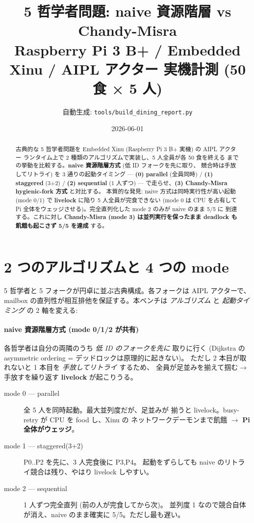\documentclass[a4paper,11pt]{ltjsarticle}
\title{5 哲学者問題: naive 資源階層 vs Chandy-Misra \\
  \large Raspberry Pi 3 B+ / Embedded Xinu / AIPL アクター 実機計測 (50 食 × 5 人)}
\author{自動生成: \texttt{tools/build\_dining\_report.py}}
\date{2026-06-01}
\begin{document}
\maketitle

\begin{abstract}
古典的な 5 哲学者問題を Embedded Xinu (Raspberry Pi 3 B+ 実機) の AIPL アクター
ランタイム上で 2 種類のアルゴリズムで実装し、5 人全員が各 50 食を終える
までの挙動を比較する。\textbf{naive 資源階層方式} (低 ID フォークを先に取り、
競合時は手放してリトライ) を 3 通りの起動タイミング — \textbf{(0) parallel}
(全員同時) / \textbf{(1) staggered} (3+2) / \textbf{(2) sequential} (1 人ずつ) —
で走らせ、\textbf{(3) Chandy-Misra hygienic-fork 方式} と対比する。
本質的な発見: naive 方式は同時実行性が高い起動 (mode 0/1) で
\textbf{livelock} に陥り 5 人全員が完食できない (mode 0 は CPU を占有して
Pi 全体をウェッジさせる)。完全直列化した mode 2 のみが naive のまま 5/5 に
到達する。これに対し \textbf{Chandy-Misra (mode 3) は並列実行を保ったまま
deadlock も飢餓も起こさず 5/5 を達成} する。
\end{abstract}

\section{2 つのアルゴリズムと 4 つの mode}

5 哲学者と 5 フォークが円卓に並ぶ古典構成。各フォークは AIPL アクターで、
mailbox の直列性が相互排他を保証する。本ベンチは \emph{アルゴリズム} と
\emph{起動タイミング} の 2 軸を変える:

\paragraph{naive 資源階層方式 (mode 0/1/2 が共有)}
各哲学者は自分の両隣のうち \emph{低 ID のフォークを先に} 取りに行く
(Dijkstra の asymmetric ordering = デッドロックは原理的に起きない)。
ただし 2 本目が取れないと 1 本目を \emph{手放してリトライ} するため、
全員が足並みを揃えて掴む$\to$手放すを繰り返す \textbf{livelock} が起こりうる。

\begin{description}
  \item[mode 0 — parallel] 全 5 人を同時起動。最大並列度だが、足並みが
        揃うと livelock。busy-retry が CPU を food し、Xinu の
        ネットワークデーモンまで飢餓 $\to$ \textbf{Pi 全体がウェッジ}。
  \item[mode 1 — staggered(3+2)] P0..P2 を先に、3 人完食後に P3,P4。
        起動をずらしても naive のリトライ競合は残り、やはり livelock しやすい。
  \item[mode 2 — sequential] 1 人ずつ完全直列 (前の人が完食してから次)。
        並列度 1 なので競合自体が消え、naive のまま確実に 5/5。ただし最も遅い。
\end{description}
\end{document}
